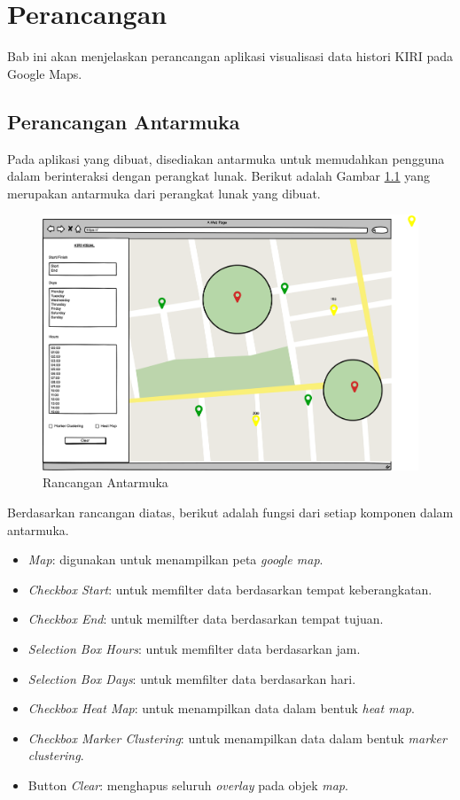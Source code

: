\chapter{Perancangan}
\label{chap:perancangan}
Bab ini akan menjelaskan perancangan aplikasi visualisasi data histori KIRI pada Google Maps.

\section{Perancangan Antarmuka}
\label{sec:perancanganAntarmuka}
Pada aplikasi yang dibuat, disediakan antarmuka untuk memudahkan pengguna dalam berinteraksi dengan perangkat lunak. Berikut adalah Gambar \ref{fig:antarmuka} yang merupakan antarmuka dari perangkat lunak yang dibuat.

\begin{figure}[H]
	\centering  
	\includegraphics[scale=0.3]{Gambar/mockup.PNG}  
	\caption[Rancangan Antarmuka]{Rancangan Antarmuka} 
	\label{fig:antarmuka} 
\end{figure}

Berdasarkan rancangan diatas, berikut adalah fungsi dari setiap komponen dalam antarmuka.
\begin{itemize}
	\item \textit{Map}: digunakan untuk menampilkan peta \textit{google map}.
	\item \textit{Checkbox Start}: untuk memfilter data berdasarkan tempat keberangkatan.
	\item \textit{Checkbox End}: untuk memilfter data berdasarkan tempat tujuan.
	\item \textit{Selection Box Hours}: untuk memfilter data berdasarkan jam.
	\item \textit{Selection Box Days}: untuk memfilter data berdasarkan hari.
	\item \textit{Checkbox Heat Map}: untuk menampilkan data dalam bentuk \textit{heat map}.
	\item \textit{Checkbox Marker Clustering}: untuk menampilkan data dalam bentuk \textit{marker clustering}.
	\item Button \textit{Clear}: menghapus seluruh \textit{overlay} pada objek \textit{map}.
\end{itemize}

